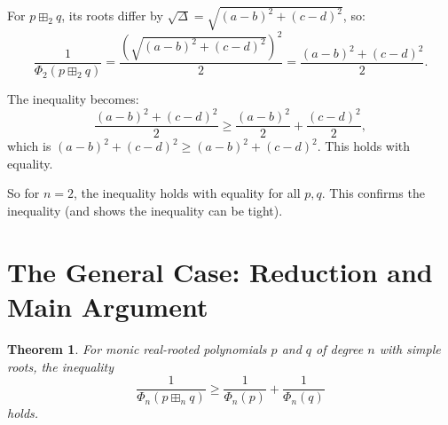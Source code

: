 \documentclass[12pt]{article}
\newtheorem{theorem}{Theorem}
\begin{document}
For $p \boxplus_2 q$, its roots differ by $\sqrt{\Delta} = \sqrt{(a-b)^2+(c-d)^2}$, so:
\[
\frac{1}{\Phi_2(p \boxplus_2 q)} = \frac{(\sqrt{(a-b)^2+(c-d)^2})^2}{2} = \frac{(a-b)^2+(c-d)^2}{2}.
\]

The inequality becomes:
\[
\frac{(a-b)^2+(c-d)^2}{2} \geq \frac{(a-b)^2}{2} + \frac{(c-d)^2}{2},
\]
which is $(a-b)^2 + (c-d)^2 \geq (a-b)^2 + (c-d)^2$. This holds with equality.

So for $n=2$, the inequality holds with equality for all $p, q$. This confirms the inequality (and shows the inequality can be tight).

\section{The General Case: Reduction and Main Argument}

\begin{theorem}\label{thm:main}
For monic real-rooted polynomials $p$ and $q$ of degree $n$ with simple roots, the inequality
\[
\frac{1}{\Phi_n(p \boxplus_n q)} \geq \frac{1}{\Phi_n(p)} + \frac{1}{\Phi_n(q)}
\]
holds.
\end{theorem}
\end{document}
